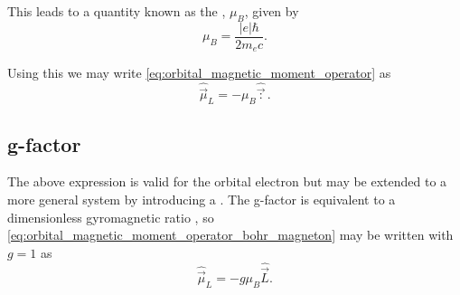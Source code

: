 This leads to a quantity known as the \textbf{}, $\mu_B$, given by 
\begin{equation}
    \mu_B = \frac{|e|\hbar}{2m_e c}.
    \label{eq:bohr_magneton}
\end{equation}

Using this we may write \eqref{eq:orbital_magnetic_moment_operator} as 
\begin{equation}
    \hat{\vec{\mu}}_L = -\mu_B\hat{\vec{:}}. 
    \label{eq:orbital_magnetic_moment_operator_bohr_magneton}
\end{equation}


\subsection{g-factor}
The above expression is valid for the orbital electron but may be extended to a more general system by introducing a . The g-factor is equivalent to a dimensionless gyromagnetic ratio \cite{giancoli2008physics}, so \eqref{eq:orbital_magnetic_moment_operator_bohr_magneton} may be written with $g=1$ as 
\begin{equation}
    \hat{\vec{\mu}}_L = -g\mu_B\hat{\vec{L}}. 
    \label{eq:orbital_magnetic_moment_operator_bohr_magneton_g_factor}
\end{equation}


